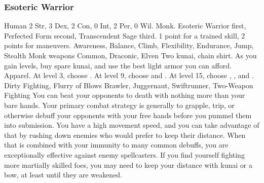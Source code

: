         \subsubsection{Esoteric Warrior}
             Human
             2 Str, 3 Dex, 2 Con, 0 Int, 2 Per, 0 Wil.
             Monk.
             Esoteric Warrior first, Perfected Form second, Transcendent Sage third.
             1 point for a trained skill, 2 points for maneuvers.
             Awareness, Balance, Climb, Flexibility, Endurance, Jump, Stealth
             Monk weapons
             Common, Draconic, Elven
             Two kunai, chain shirt. As you gain levels, buy spare kunai, and use the best light armor you can afford.
             Apparel.
                At level 3, choose .
                At level 9, choose  and .
                At level 15, choose , , and .
             Dirty Fighting, Flurry of Blows
             Brawler, Juggernaut, Swiftrunner, Two-Weapon Fighting
             You can beat your opponents to death with nothing more than your bare hands.
            Your primary combat strategy is generally to grapple, trip, or otherwise debuff your opponents with your free hands before you pummel them into submission.
            You have a high movement speed, and you can take advantage of that by rushing down enemies who would prefer to keep their distance.
            When that is combined with your immunity to many common debuffs, you are exceptionally effective against enemy spellcasters.
            If you find yourself fighting more martially skilled foes, you may need to keep your distance with kunai or a bow, at least until they are weakened.

